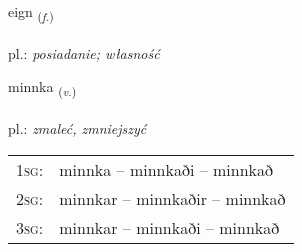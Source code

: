 \documentclass[frontgrid, backgrid]{flacards}\usepackage[]{graphicx}\usepackage[]{xcolor}
\begin{document}
\renewcommand{\flhead}{\vskip5pt \fboxsep=0pt {\small\bfseries\footnotesize Nafnorð | rzeczownik}}
\renewcommand{\fcfoot}{\vskip5pt \fboxsep=0pt \hspace{2pt}{\small\bfseries\footnotesize 1K}}

\renewcommand{\blhead}{\vskip5pt {\small\bfseries\footnotesize Nafnorð | rzeczownik }}
\renewcommand{\bcfoot}{\vskip5pt \hspace{2pt}{\small\bfseries\footnotesize 1K}}


{eign \small{\textsubscript{(\textit{f.})}} \\[1ex] %
\textphonetic{[eikn̥]} \\
pl.: \emph{posiadanie; własność} \\  [2ex]
\renewcommand*{\arraystretch}{0.8}
}

\renewcommand{\flhead}{\vskip5pt \fboxsep=0pt {\small\bfseries\footnotesize Sagnorð | czasownik}}
\renewcommand{\fcfoot}{\vskip5pt \fboxsep=0pt \hspace{2pt}{\small\bfseries\footnotesize 1K}}

\renewcommand{\blhead}{\vskip5pt {\small\bfseries\footnotesize Sagnorð | czasownik }}
\renewcommand{\bcfoot}{\vskip5pt \hspace{2pt}{\small\bfseries\footnotesize 1K}}


{minnka \small{\textsubscript{(\textit{v.})}} \\[1ex] %
\textphonetic{[miŋ̥ka]} \\
pl.: \emph{zmaleć, zmniejszyć} \\  [2ex]
\renewcommand*{\arraystretch}{0.8}
\begin{tabular}{p{1cm}l}
\textsc{1sg}: & minnka -- minnkaði -- minnkað \\ 
\textsc{2sg}: & minnkar -- minnkaðir -- minnkað \\ 
\textsc{3sg}: & minnkar -- minnkaði -- minnkað \\ 
\end{tabular}
}
\end{document}
